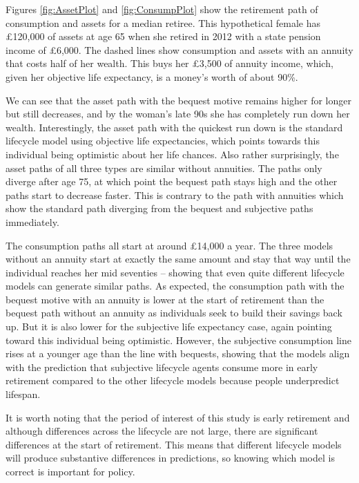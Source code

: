 \documentclass[12pt]{article}
\begin{document}
Figures \ref{fig:AssetPlot} and \ref{fig:ConsumpPlot} show the retirement path
of consumption and assets for a median retiree. This hypothetical female has
£120,000 of assets at age 65 when she retired in 2012 with a state pension
income of £6,000. The dashed lines show consumption and assets with an annuity
that costs half of her wealth. This buys her £3,500 of annuity income, which,
given her objective life expectancy, is a money's worth of about 90\%.

We can see that the asset path with the bequest motive remains higher for longer
but still decreases, and by the woman's late 90s she has completely run down her
wealth. Interestingly, the asset path with the quickest run down is the standard
lifecycle model using objective life expectancies, which points towards this
individual being optimistic about her life chances. Also rather surprisingly,
the asset paths of all three types are similar without annuities. The paths only
diverge after age 75, at which point the bequest path stays high and the other
paths start to decrease faster. This is contrary to the path with annuities
which show the standard path diverging from the bequest and subjective paths
immediately.

The consumption paths all start at around £14,000 a year. The three models without an
annuity start at exactly the same amount and stay that way until the individual
reaches her mid seventies -- showing that even quite different lifecycle models
can generate similar paths. As expected, the consumption path with the bequest
motive with an annuity is lower at the start of retirement than the bequest path
without an annuity as individuals seek to build their savings back up. But it is
also lower for the subjective life expectancy case, again pointing toward this
individual being optimistic. However, the subjective consumption line rises at a
younger age than the line with bequests, showing that the models align with the
prediction that subjective lifecycle agents consume more in early retirement
compared to the other lifecycle models because people underpredict lifespan.

It is worth noting that the period of interest of this study is early retirement
and although differences across the lifecycle are not large, there are
significant differences at the start of retirement. This means that different
lifecycle models will produce substantive differences in predictions, so knowing
which model is correct is important for policy.
\end{document}
